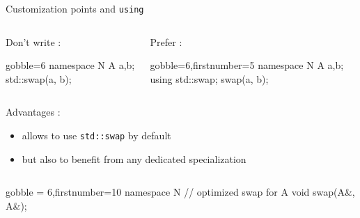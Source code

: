 \begin{frame}[fragile]
  \begin{block}{Customization points and \texttt{using}}
    \begin{columns}[t]
      \begin{column}{.35\textwidth}
        Don't write :
        \begin{cppcode*}{gobble=6}
          namespace N {
            A a,b;
            std::swap(a, b);
          }
        \end{cppcode*}
      \end{column}
      \begin{column}{.35\textwidth}
        Prefer :
        \begin{cppcode*}{gobble=6,firstnumber=5}
          namespace N {
            A a,b;
            using std::swap;
            swap(a, b);
          }
        \end{cppcode*}
      \end{column}
    \end{columns}
    \vspace{.2cm}
    Advantages :
    \begin{itemize}
    \item allows to use \texttt{std::swap} by default
    \item but also to benefit from any dedicated specialization
    \end{itemize}
    \begin{columns}
      \begin{column}{.7\textwidth}
        \begin{cppcode*}{gobble = 6,firstnumber=10}
          namespace N {
            // optimized swap for A
            void swap(A&, A&);
          }
        \end{cppcode*}
      \end{column}
    \end{columns}
  \end{block}
\end{frame}
